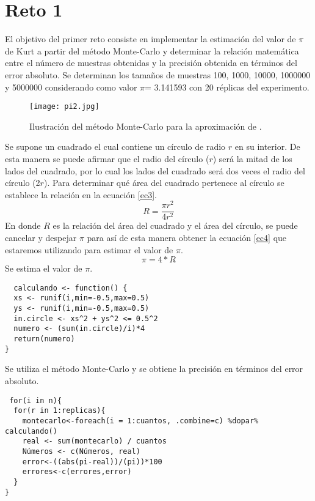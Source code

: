 \documentclass[12pt]{amsart}
\begin{document}
\section{Reto 1}
El objetivo del primer reto consiste en implementar la estimación del valor de $\pi$ de Kurt \cite{kurt} a partir del método Monte-Carlo y determinar la relación matemática entre el número de muestras obtenidas y la precisión obtenida en términos del error absoluto.
Se determinan los tamaños de muestras 100, 1000, 10000, 1000000 y 5000000 considerando como valor $\pi$= 3.141593 con 20 réplicas del experimento.
\begin{figure} [h!]
    \centering
    \texttt{[image: pi2.jpg]}
    \caption{Ilustración del método Monte-Carlo para la aproximación de \pi.}
    \label{fig3}
\end{figure}
Se supone un cuadrado el cual contiene un círculo de radio $r$ en su interior. De esta manera se puede afirmar que el radio
del círculo ($r$) será la mitad de los lados del cuadrado, por lo cual los lados del cuadrado será dos veces el radio del círculo
(2$r$). Para determinar qué área del cuadrado pertenece al círculo se establece la relación en la ecuación \eqref{ec3}.
\begin{equation}
R= \frac{\pi r^2} {4 r^2}
\label{ec3}
\end{equation}
En donde $R$ es la relación del área del cuadrado y el área del círculo, se puede cancelar y despejar $\pi$ para así de esta manera obtener la ecuación \eqref{ec4} que estaremos utilizando para estimar el valor de $\pi$.
\begin{equation}
\pi= 4*R
\label{ec4}
\end{equation}
\newpage
Se estima el valor de $\pi$.
\renewcommand{\listingscaption}{Código}
\begin{listing}[H]
  \begin{verbatim}
  calculando <- function() {
  xs <- runif(i,min=-0.5,max=0.5)
  ys <- runif(i,min=-0.5,max=0.5)
  in.circle <- xs^2 + ys^2 <= 0.5^2
  numero <- (sum(in.circle)/i)*4
  return(numero)
}
  \end{verbatim}
  \label{codigo4}
\end{listing}
Se utiliza el método Monte-Carlo y se obtiene la precisión en términos del error absoluto.
\renewcommand{\listingscaption}{Código}
\begin{listing}[H]
  \begin{verbatim}
 for(i in n){
  for(r in 1:replicas){
    montecarlo<-foreach(i = 1:cuantos, .combine=c) %dopar% calculando()
    real <- sum(montecarlo) / cuantos
    Números <- c(Números, real)
    error<-((abs(pi-real))/(pi))*100
    errores<-c(errores,error)
  }
}
  \end{verbatim}
  \label{codigo5}
\end{listing}
\end{document}
